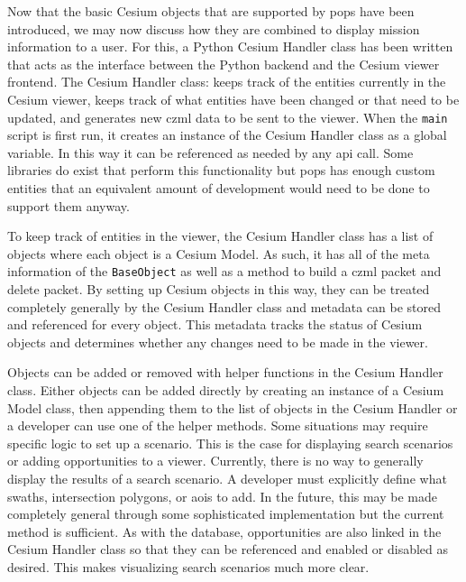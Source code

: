 Now that the basic Cesium objects that are supported by \gls{pops} have been
introduced, we may now discuss how they are combined to display mission
information to a user.  For this, a Python Cesium Handler class has been
written that acts as the interface between the Python backend and the Cesium
viewer frontend. The Cesium Handler class: keeps track of the entities
currently in the Cesium viewer, keeps track of what entities have been changed
or that need to be updated, and generates new \gls{czml} data to be sent to the
viewer. When the \texttt{main} script is first run, it creates an instance of
the Cesium Handler class as a global variable. In this way it can be referenced
as needed by any \gls{api} call.  Some libraries do exist that perform this
functionality but \gls{pops} has enough custom entities that an equivalent
amount of development would need to be done to support them anyway.

To keep track of entities in the viewer, the Cesium Handler class has a list of
objects where each object is a Cesium Model. As such, it has all of the meta
information of the \texttt{BaseObject} as well as a method to build a
\gls{czml} packet and delete packet. By setting up Cesium objects in this way,
they can be treated completely generally by the Cesium Handler class and
metadata can be stored and referenced for every object. This metadata tracks
the status of Cesium objects and determines whether any changes need to be made
in the viewer. 

Objects can be added or removed with helper functions in the Cesium Handler
class. Either objects can be added directly by creating an instance of a Cesium
Model class, then appending them to the list of objects in the Cesium Handler
or a developer can use one of the helper methods. Some situations may require
specific logic to set up a scenario. This is the case for displaying search
scenarios or adding opportunities to a viewer. Currently, there is no way to
generally display the results of a search scenario. A developer must explicitly
define what swaths, intersection polygons, or \glspl{aoi} to add. In the
future, this may be made completely general through some sophisticated
implementation but the current method is sufficient. As with the database,
opportunities are also linked in the Cesium Handler class so that they can be
referenced and enabled or disabled as desired. This makes visualizing search
scenarios much more clear. 

